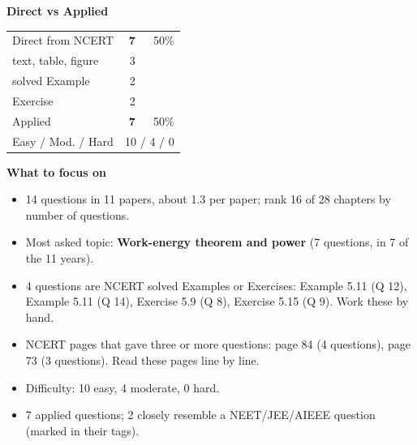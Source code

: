 \begin{minipage}[t]{0.34\linewidth}{\small\textbf{\color{crimson}Direct vs Applied}\par\smallskip
\begin{tabular}{@{}lrr@{}}\toprule
Direct from NCERT & \textbf{7} & 50\%\\
\quad text, table, figure & 3 &\\
\quad solved Example & 2 &\\
\quad Exercise & 2 &\\
Applied & \textbf{7} & 50\%\\\midrule
Easy / Mod. / Hard & \multicolumn{2}{r}{10 / 4 / 0}\\\bottomrule
\end{tabular}}\end{minipage}\hfill
\begin{minipage}[t]{0.63\linewidth}{\small\textbf{\color{crimson}What to focus on}\par\smallskip
\begin{itemize}[leftmargin=1.1em,itemsep=1pt,topsep=0pt]
\item 14 questions in 11 papers, about 1.3 per paper; rank 16 of 28 chapters by number of questions.
\item Most asked topic: \textbf{Work-energy theorem and power} (7 questions, in 7 of the 11 years).
\item 4 questions are NCERT solved Examples or Exercises: Example 5.11 (Q 12), Example 5.11 (Q 14), Exercise 5.9 (Q 8), Exercise 5.15 (Q 9). Work these by hand.
\item NCERT pages that gave three or more questions: page 84 (4 questions), page 73 (3 questions). Read these pages line by line.
\item Difficulty: 10 easy, 4 moderate, 0 hard.
\item 7 applied questions; 2 closely resemble a NEET/JEE/AIEEE question (marked in their tags).
\end{itemize}}\end{minipage}\par
{}
